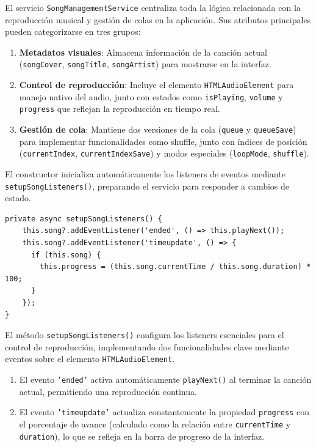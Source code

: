 \documentclass[11pt, a4paper]{article}
\begin{document}
                El servicio \texttt{SongManagementService} centraliza toda la lógica relacionada con la reproducción musical y gestión de colas en la aplicación. Sus atributos principales pueden categorizarse en tres grupos:

                \begin{enumerate}
                    \item \textbf{Metadatos visuales}: Almacena información de la canción actual (\texttt{songCover}, \texttt{songTitle}, \texttt{songArtist}) para mostrarse en la interfaz.
                    \item \textbf{Control de reproducción}: Incluye el elemento \texttt{HTMLAudioElement} para manejo nativo del audio, junto con estados como \texttt{isPlaying}, \texttt{volume} y \texttt{progress} que reflejan la reproducción en tiempo real.
                    \item \textbf{Gestión de cola}: Mantiene dos versiones de la cola (\texttt{queue} y \texttt{queueSave}) para implementar funcionalidades como shuffle, junto con índices de posición (\texttt{currentIndex}, \texttt{currentIndexSave}) y modos especiales (\texttt{loopMode}, \texttt{shuffle}).
                \end{enumerate}

                El constructor inicializa automáticamente los listeners de eventos mediante \texttt{setupSongListeners()}, preparando el servicio para responder a cambios de estado.

                \begin{lstlisting}[caption={setUpSongListeners()}]
private async setupSongListeners() {
    this.song?.addEventListener('ended', () => this.playNext());
    this.song?.addEventListener('timeupdate', () => {
      if (this.song) {
        this.progress = (this.song.currentTime / this.song.duration) * 100;
      }
    });
}
                \end{lstlisting}

                El método \texttt{setupSongListeners()} configura los listeners esenciales para el control de reproducción, implementando dos funcionalidades clave mediante eventos sobre el elemento \texttt{HTMLAudioElement}.

                \begin{enumerate}
                  \item El evento \texttt{'ended'} activa automáticamente \texttt{playNext()} al terminar la canción actual, permitiendo una reproducción continua.
                  \item El evento \texttt{'timeupdate'} actualiza constantemente la propiedad \texttt{progress} con el porcentaje de avance (calculado como la relación entre \texttt{currentTime} y \texttt{duration}), lo que se refleja en la barra de progreso de la interfaz.
                \end{enumerate}
\end{document}
